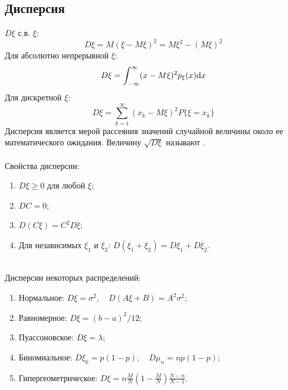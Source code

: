 \subsection{Дисперсия}
 $D\xi$ с.в. $\xi$:
\begin{equation*}
    D\xi = M(\xi - M\xi)^2 = M\xi^2 - (M\xi)^2
\end{equation*}
Для абсолютно непрерывной $\xi$:
\begin{equation*}
    D\xi = \int_{-\infty}^\infty (x - M\xi)^2 p_\xi(x) \mathrm{d}{x}
\end{equation*}
Для дискретной $\xi$:
\begin{equation*}
    D\xi = \sum_{k=1}^\infty (x_k - M\xi)^2 P\{\xi = x_k\}
\end{equation*}
Дисперсия является мерой рассеяния значений случайной величины около ее математического ожидания.
Величину $\sqrt{D\xi}$ называют .\\
\\
Свойства дисперсии:
\begin{enumerate}
    \item $D\xi \ge 0$ для любой $\xi$;
    \item $DC = 0$;
    \item $D(C\xi) = C^2D\xi$;
    \item Для независимых $\xi_1$ и $\xi_2$: $D(\xi_1 + \xi_2) = D\xi_1 + D\xi_2$.
\end{enumerate}
\ \\
Дисперсии некоторых распределений:
\begin{enumerate}
    \item Нормальное: $D\xi = \sigma^2, \quad D(A\xi + B) = A^2\sigma^2$;
    \item Равномерное: $D\xi = (b - a)^2 / 12$;
    \item Пуассоновское: $D\xi = \lambda$;
    \item Биномиальное: $D\xi_k = p(1 - p), \quad D\mu_n = np(1 - p)$;
    \item Гипергеометрическое: $D\xi = n \frac{M}{N} \left(1 - \frac{M}{N}\right) \frac{N - n}{N - 1}$.
\end{enumerate}


